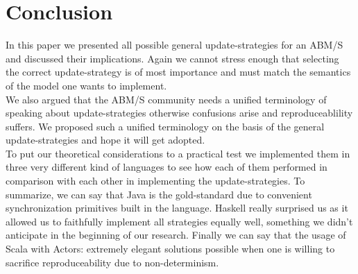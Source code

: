 \section{Conclusion}
In this paper we presented all possible general update-strategies for an ABM/S and discussed their implications. Again we cannot stress enough that selecting the correct update-strategy is of most importance and must match the semantics of the model one wants to implement. \\
We also argued that the ABM/S community needs a unified terminology of speaking about update-strategies otherwise confusions arise and reproduceablility suffers. We proposed such a unified terminology on the basis of the general update-strategies and hope it will get adopted. \\
To put our theoretical considerations to a practical test we implemented them in three very different kind of languages to see how each of them performed in comparison with each other in implementing the update-strategies. To summarize, we can say that Java is the gold-standard due to convenient synchronization primitives built in the language. Haskell really surprised us as it allowed us to faithfully implement all strategies equally well, something we didn't anticipate in the beginning of our research. Finally we can say that the usage of Scala with Actors: extremely elegant solutions possible when one is willing to sacrifice reproduceability due to non-determinism.
